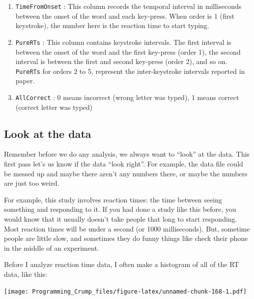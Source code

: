 \documentclass[]{book}
\newenvironment{Shaded}{\begin{snugshade}}{\end{snugshade}}
\newcommand{\KeywordTok}[1]{\textcolor[rgb]{0.13,0.29,0.53}{\textbf{{#1}}}}
\newcommand{\NormalTok}[1]{{#1}}
\providecommand{\tightlist}{%
  \setlength{\itemsep}{0pt}\setlength{\parskip}{0pt}}
\theoremstyle{definition}
\theoremstyle{definition}
\theoremstyle{definition}
\theoremstyle{remark}
\begin{document}
\begin{enumerate}
\def\labelenumi{\arabic{enumi}.}
\tightlist
\item
  \texttt{TimeFromOnset} : This column records the temporal interval in
  milliseconds between the onset of the word and each key-press. When
  order is 1 (first keystroke), the number here is the reaction time to
  start typing.
\item
  \texttt{PureRTs} : This column contains keystroke intervals. The first
  interval is between the onset of the word and the first key-press
  (order 1), the second interval is between the first and second
  key-press (order 2), and so on. \texttt{PureRTs} for orders 2 to 5,
  represent the inter-keystroke intervals reported in paper.
\item
  \texttt{AllCorrect} : 0 means incorrect (wrong letter was typed), 1
  means correct (correct letter was typed)
\end{enumerate}

\subsection{Look at the data}\label{look-at-the-data-3}

Remember before we do any analysis, we always want to ``look'' at the
data. This first pass let's us know if the data ``look right''. For
example, the data file could be messed up and maybe there aren't any
numbers there, or maybe the numbers are just too weird.

For example, this study involves reaction times: the time between seeing
something and responding to it. If you had done a study like this
before, you would know that it usually doesn't take people that long to
start responding. Most reaction times will be under a second (or 1000
milliseconds). But, sometime people are little slow, and sometimes they
do funny things like check their phone in the middle of an experiment.

Before I analyze reaction time data, I often make a histogram of all of
the RT data, like this:

\begin{Shaded}
\end{Shaded}

\texttt{[image: Programming\_Crump\_files/figure-latex/unnamed-chunk-168-1.pdf]}
\end{document}
